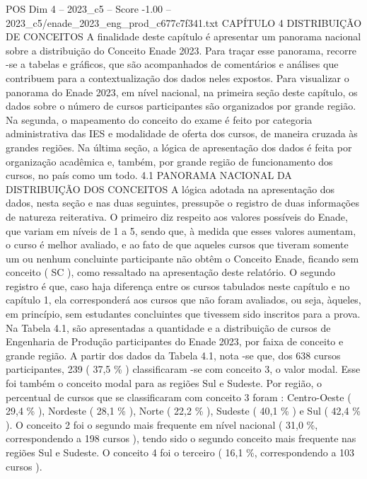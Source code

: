 \begin{textsample}{POS Dim 4 – 2023\_c5 – Score -1.00 – 2023\_c5/enade\_2023\_eng\_prod\_c677c7f341.txt}  \label{ex:f4_pos_271}
CAPÍTULO 4 DISTRIBUIÇÃO DE CONCEITOS A finalidade deste capítulo é apresentar um panorama nacional sobre a distribuição do Conceito Enade 2023.
Para traçar esse panorama, recorre -se a tabelas e gráficos, que são acompanhados de comentários e análises que contribuem para a contextualização dos dados neles expostos.
Para visualizar o panorama do Enade 2023, em nível nacional, na primeira seção deste capítulo, os dados sobre o número de cursos participantes são organizados por grande região.
Na segunda, o mapeamento do conceito do exame é feito por categoria administrativa das IES e modalidade de oferta dos cursos, de maneira cruzada às grandes regiões.
Na última seção, a lógica de apresentação dos dados é feita por organização acadêmica e, também, por grande região de funcionamento dos cursos, no país como um todo. 4.1 PANORAMA NACIONAL DA DISTRIBUIÇÃO DOS CONCEITOS A lógica adotada na apresentação dos dados, nesta seção e nas duas seguintes, pressupõe o registro de duas informações de natureza reiterativa.
O primeiro diz respeito aos valores possíveis do Enade, que variam em níveis de 1 a 5, sendo que, à medida que esses valores aumentam, o curso é melhor avaliado, e ao fato de que aqueles cursos que tiveram somente um ou nenhum concluinte participante não obtêm o Conceito Enade, ficando sem conceito ( SC ), como ressaltado na apresentação deste relatório.
O segundo registro é que, caso haja diferença entre os cursos tabulados neste capítulo e no capítulo 1, ela corresponderá aos cursos que não foram avaliados, ou seja, àqueles, em princípio, sem estudantes concluintes que tivessem sido inscritos para a prova.
Na Tabela 4.1, são apresentadas a quantidade e a distribuição de cursos de Engenharia de Produção participantes do Enade 2023, por faixa de conceito e grande região.
A partir dos dados da Tabela 4.1, nota -se que, dos 638 cursos participantes, 239 ( 37,5 \% ) classificaram -se com conceito 3, o valor modal.
Esse foi também o conceito modal para as regiões Sul e Sudeste.
Por região, o percentual de cursos que se classificaram com conceito 3 foram : Centro-Oeste ( 29,4 \% ), Nordeste ( 28,1 \% ), Norte ( 22,2 \% ), Sudeste ( 40,1 \% ) e Sul ( 42,4 \% ).
O conceito 2 foi o segundo mais frequente em nível nacional ( 31,0 \%, correspondendo a 198 cursos ), tendo sido o segundo conceito mais frequente nas regiões Sul e Sudeste.
O conceito 4 foi o terceiro ( 16,1 \%, correspondendo a 103 cursos ).

\end{textsample}
